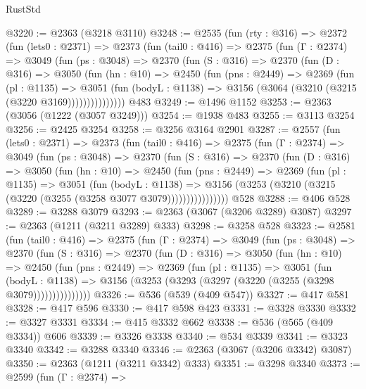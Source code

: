 \begin{lexlean}{RustStd}
\begin{coremodule}
@3220 := @2363 (@3218 @3110)
@3248 := @2535
    (fun (rty : @316) =>
    @2372
      (fun (lets0 : @2371) =>
      @2373
        (fun (tail0 : @416) =>
        @2375
          (fun (Γ : @2374) =>
          @3049
            (fun (ps : @3048) =>
            @2370
              (fun (S : @316) =>
              @2370
                (fun (D : @316) =>
                @3050
                  (fun (hn : @10) =>
                  @2450
                    (fun (pns : @2449) =>
                    @2369
                      (fun (pl : @1135) =>
                      @3051
                        (fun (bodyL : @1138) =>
                        @3156 (@3064 (@3210 (@3215 (@3220 @3169)))))))))))))))
    @483
@3249 := @1496 @1152
@3253 := @2363 (@3056 (@1222 (@3057 @3249)))
@3254 := @1938 @483
@3255 := @3113 @3254
@3256 := @2425 @3254
@3258 := @3256 @3164 @2901
@3287 := @2557
    (fun (lets0 : @2371) =>
    @2373
      (fun (tail0 : @416) =>
      @2375
        (fun (Γ : @2374) =>
        @3049
          (fun (ps : @3048) =>
          @2370
            (fun (S : @316) =>
            @2370
              (fun (D : @316) =>
              @3050
                (fun (hn : @10) =>
                @2450
                  (fun (pns : @2449) =>
                  @2369
                    (fun (pl : @1135) =>
                    @3051
                      (fun (bodyL : @1138) =>
                      @3156 (@3253 (@3210 (@3215 (@3220 (@3255 (@3258 @3077 @3079))))))))))))))))
    @528
@3288 := @406 @528
@3289 := @3288 @3079
@3293 := @2363 (@3067 (@3206 @3289) @3087)
@3297 := @2363 (@1211 (@3211 @3289) @333)
@3298 := @3258 @528
@3323 := @2581
    (fun (tail0 : @416) =>
    @2375
      (fun (Γ : @2374) =>
      @3049
        (fun (ps : @3048) =>
        @2370
          (fun (S : @316) =>
          @2370
            (fun (D : @316) =>
            @3050
              (fun (hn : @10) =>
              @2450
                (fun (pns : @2449) =>
                @2369
                  (fun (pl : @1135) =>
                  @3051
                    (fun (bodyL : @1138) =>
                    @3156 (@3253 (@3293 (@3297 (@3220 (@3255 (@3298 @3079)))))))))))))))
@3326 := @536 (@539 (@409 @547))
@3327 := @417 @581
@3328 := @417 @596
@3330 := @417 @598 @423
@3331 := @3328 @3330
@3332 := @3327 @3331
@3334 := @415 @3332 @662
@3338 := @536 (@565 (@409 @3334)) @606
@3339 := @3326 @3338
@3340 := @534 @3339
@3341 := @3323 @3340
@3342 := @3288 @3340
@3346 := @2363 (@3067 (@3206 @3342) @3087)
@3350 := @2363 (@1211 (@3211 @3342) @333)
@3351 := @3298 @3340
@3373 := @2599
    (fun (Γ : @2374) =>

\end{coremodule}
\end{lexlean}
